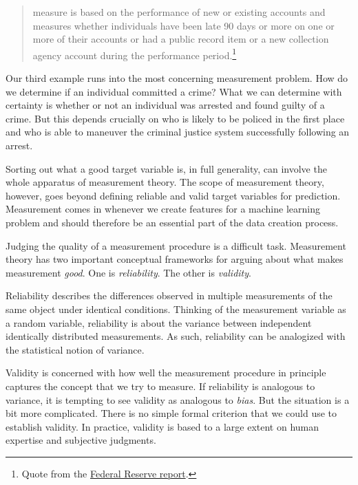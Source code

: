 \documentclass{tufte-book}
\begin{document}
\begin{quote}
measure is based on the performance of new or existing accounts and
measures whether individuals have been late 90 days or more on one or
more of their accounts or had a public record item or a new collection
agency account during the performance period.\footnote{Quote from the
  \href{https://www.federalreserve.gov/boarddocs/rptcongress/creditscore/performance.htm\#toc9.5}{Federal
  Reserve report}.}
\end{quote}

Our third example runs into the most concerning measurement problem. How
do we determine if an individual committed a crime? What we can
determine with certainty is whether or not an individual was arrested
and found guilty of a crime. But this depends crucially on who is likely
to be policed in the first place and who is able to maneuver the
criminal justice system successfully following an arrest.

Sorting out what a good target variable is, in full generality, can
involve the whole apparatus of measurement theory. The scope of
measurement theory, however, goes beyond defining reliable and valid
target variables for prediction. Measurement comes in whenever we create
features for a machine learning problem and should therefore be an
essential part of the data creation process.

Judging the quality of a measurement procedure is a difficult task.
Measurement theory has two important conceptual frameworks for arguing
about what makes measurement \emph{good}. One is \emph{reliability}. The
other is
\emph{validity}.

Reliability describes the differences observed in multiple measurements
of the same object under identical conditions. Thinking of the
measurement variable as a random variable, reliability is about the
variance between independent identically distributed measurements. As
such, reliability can be analogized with the statistical notion of
variance.

Validity is concerned with how well the measurement procedure in
principle captures the concept that we try to measure. If reliability is
analogous to variance, it is tempting to see validity as analogous to
\emph{bias}. But the situation is a bit more complicated. There is no
simple formal criterion that we could use to establish validity. In
practice, validity is based to a large extent on human expertise and
subjective judgments.
\end{document}
